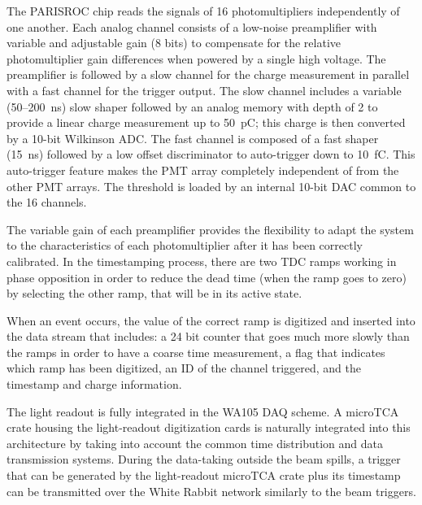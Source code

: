 The PARISROC chip reads the signals of 16 photomultipliers
independently of one another. Each analog channel consists of a
low-noise preamplifier with variable and adjustable gain (8 bits) to
compensate for the relative photomultiplier gain differences when
powered by a single high voltage. The preamplifier is followed by a
slow channel for the charge measurement in parallel with a fast
channel for the trigger output. The slow channel includes a variable
(50--200~ns) slow shaper followed by an analog memory with depth of 2
to provide a linear charge measurement up to 50~pC; this charge is
then converted by a 10-bit Wilkinson ADC. The fast channel is composed
of a fast shaper (15~ns) followed by a low offset discriminator to
auto-trigger down to 10~fC. This auto-trigger feature makes the PMT
array completely independent of from the other PMT arrays. The
threshold is loaded by an internal 10-bit DAC common to the 16
channels.


The variable gain of each preamplifier provides the flexibility to
adapt the system to the characteristics of each photomultiplier after
it has been correctly calibrated. In the timestamping process, there
are two TDC ramps working in phase opposition in order to reduce the
dead time (when the ramp goes to zero) by selecting the other ramp,
that will be in its active state.

When an event occurs, the value of the correct ramp is digitized and
inserted into the data stream that includes: a 24 bit counter that
goes much more slowly than the ramps in order to have a coarse time
measurement, a flag that indicates which ramp has been digitized, an
ID of the channel triggered, and the timestamp and charge information.


The light readout is fully integrated in the WA105 DAQ scheme. A
microTCA crate housing the light-readout digitization cards is
naturally integrated into this architecture by taking into account the
common time distribution and data transmission systems.  During the
data-taking outside the beam spills, a trigger that can be generated
by the light-readout microTCA crate plus its timestamp can be
transmitted over the White Rabbit network similarly to the beam
triggers.

